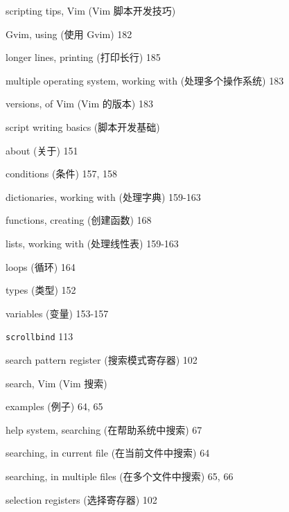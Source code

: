 \begin{multicols}{2}
\hangindent=2pc  scripting tips, Vim (Vim 脚本开发技巧) \par
\hangindent=2pc \quad Gvim, using (使用 Gvim) 182 \par
\hangindent=2pc \quad longer lines, printing (打印长行) 185 \par
\hangindent=2pc \quad multiple operating system, working with (处理多个操作系统) 183 \par
\hangindent=2pc \quad versions, of Vim (Vim 的版本) 183 \par

\hangindent=2pc  script writing basics (脚本开发基础) \par
\hangindent=2pc \quad about (关于) 151 \par
\hangindent=2pc \quad conditions (条件) 157, 158 \par
\hangindent=2pc \quad dictionaries, working with (处理字典) 159-163 \par
\hangindent=2pc \quad functions, creating (创建函数) 168 \par
\hangindent=2pc \quad lists, working with (处理线性表) 159-163 \par
\hangindent=2pc \quad loops (循环) 164 \par
\hangindent=2pc \quad types (类型) 152 \par
\hangindent=2pc \quad variables (变量) 153-157 \par

\hangindent=2pc  \texttt{scrollbind} 113

\hangindent=2pc  search pattern register (搜索模式寄存器) 102

\hangindent=2pc  search, Vim (Vim 搜索) \par
\hangindent=2pc \quad examples (例子) 64, 65 \par
\hangindent=2pc \quad help system, searching (在帮助系统中搜索) 67 \par
\hangindent=2pc \quad searching, in current file (在当前文件中搜索) 64 \par
\hangindent=2pc \quad searching, in multiple files (在多个文件中搜索) 65, 66 \par

\hangindent=2pc  selection registers (选择寄存器) 102


\end{multicols}
